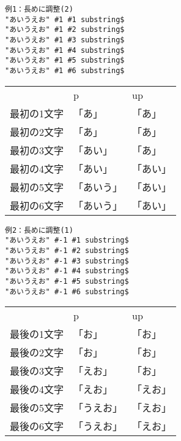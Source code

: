 \documentclass[a4paper,11pt,nomag,dvipdfmx]{jsarticle}
\def\pBibTeX{p\kern-.05em\BibTeX}
\def\upBibTeX{u\pBibTeX}
\def\pBibTeX{p\BibTeX}%
\def\upBibTeX{u\pBibTeX}%
\begin{document}
\par\medskip\noindent
\begin{minipage}{0.45\textwidth}
\begin{verbatim}
例1：長めに調整(2)
"あいうえお" #1 #1 substring$
"あいうえお" #1 #2 substring$
"あいうえお" #1 #3 substring$
"あいうえお" #1 #4 substring$
"あいうえお" #1 #5 substring$
"あいうえお" #1 #6 substring$
\end{verbatim}
\end{minipage}
\begin{minipage}{0.5\textwidth}
\begin{tabular}{lll}
            & \pBibTeX   & \upBibTeX \\
最初の1文字 & 「あ」     & 「あ」    \\
最初の2文字 & 「あ」     & 「あ」    \\
最初の3文字 & 「あい」   & 「あ」    \\
最初の4文字 & 「あい」   & 「あい」  \\
最初の5文字 & 「あいう」 & 「あい」  \\
最初の6文字 & 「あいう」 & 「あい」
\end{tabular}
\end{minipage}

\par\medskip\noindent
\begin{minipage}{0.45\textwidth}
\begin{verbatim}
例2：長めに調整(1)
"あいうえお" #-1 #1 substring$
"あいうえお" #-1 #2 substring$
"あいうえお" #-1 #3 substring$
"あいうえお" #-1 #4 substring$
"あいうえお" #-1 #5 substring$
"あいうえお" #-1 #6 substring$
\end{verbatim}
\end{minipage}
\begin{minipage}{0.5\textwidth}
\begin{tabular}{lll}
            & \pBibTeX   & \upBibTeX \\
最後の1文字 & 「お」     & 「お」    \\
最後の2文字 & 「お」     & 「お」    \\
最後の3文字 & 「えお」   & 「お」    \\
最後の4文字 & 「えお」   & 「えお」  \\
最後の5文字 & 「うえお」 & 「えお」  \\
最後の6文字 & 「うえお」 & 「えお」
\end{tabular}
\end{minipage}
\end{document}
